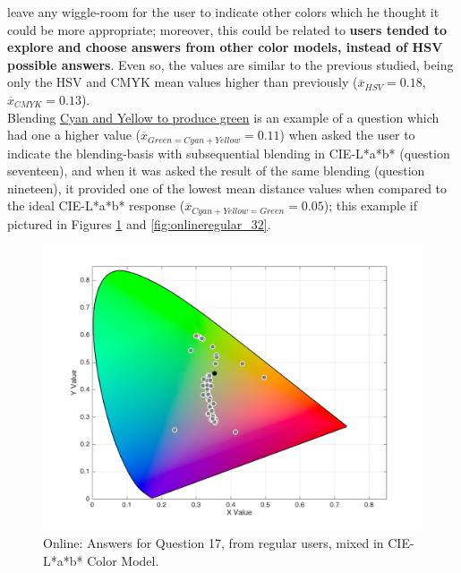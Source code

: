 \begin{itemize}
{  leave any wiggle-room for the user to indicate other colors which he thought it could be more appropriate}; moreover, this could be related to \textbf{users tended to explore and choose answers from other color
  models, instead of HSV possible answers}. Even so, the values are similar to the previous studied, being only the HSV and CMYK mean values higher than previously ($\overline{x}_{HSV} = 0.18$, $\overline{x}_{CMYK} = 0.13$).\\
  Blending \ul{Cyan and Yellow to produce green} is an example of a question which had one a higher value ($\overline{x}_{Green = Cyan + Yellow} = 0.11$) when asked the user to indicate the blending-basis with subsequential
  blending in CIE-L*a*b* (question seventeen), and when it was asked the result of the same blending (question nineteen), it provided one of the lowest mean distance values when compared to the ideal CIE-L*a*b* response
  ($\overline{x}_{Cyan + Yellow = Green} = 0.05$); this example if pictured in Figures
  \ref{fig:onlinelabregular_17} and \ref{fig:onlineregular_32}.
  \begin{figure}[!htbp]
    \centering
    \vspace{-15pt}
    \begin{minipage}{0.48\textwidth}
      \centering
      \includegraphics[width=\textwidth]{images/results/17_online_Labresponses.png}
      \caption[Online: Answers for Question 17, from regular users, mixed in CIE-L*a*b* Color Model.]{Online: Answers for Question 17, from regular users, mixed in CIE-L*a*b* Color Model.}
      \label{fig:onlinelabregular_17}
    \end{minipage}\hfill

\end{figure}
\end{itemize}
